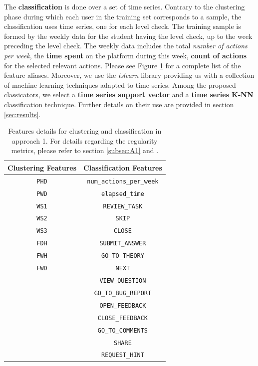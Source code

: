 \documentclass[sigplan,screen]{acmart}
\begin{document}
The \textbf{classification} is done over a set of time series. Contrary to the clustering phase during which each user in the training set corresponds to a sample, the classification uses time series, one for each level check. The training sample is formed by the weekly data for the student having the level check, up to the week preceding the level check. The weekly data includes the total \textit{number of actions per week}, the \textbf{time spent} on the platform during this week, \textbf{count of actions} for the selected relevant actions. Please see Figure \ref{tab:A1_feature_vectors} for a complete list of the feature aliases. Moreover, we use the \emph{tslearn} \cite{tslearn} library providing us with a collection of machine learning techniques adapted to time series. Among the proposed classicators, we select a \textbf{time series support vector} and a \textbf{time series K-NN} classification technique. Further details on their use are provided in section \ref{sec:results}.

\begin{table}[h]
    \centering
    \caption{Features details for clustering and classification in approach 1. For details regarding the regularity metrics, please refer to section \ref{subsec:A1} and \cite{quantifyreg}.}
    \begin{tabular}{|c|c|}
    \hline
        Clustering Features & Classification Features \\ \hline
        \texttt{PHD} & \texttt{num\_actions\_per\_week} \\ 
        \texttt{PWD} & \texttt{elapsed\_time} \\
        \texttt{WS1} & \texttt{REVIEW\_TASK} \\ 
        \texttt{WS2} &\texttt{SKIP} \\ 
        \texttt{WS3} &\texttt{CLOSE} \\ 
        \texttt{FDH} &\texttt{SUBMIT\_ANSWER} \\ 
        \texttt{FWH} &\texttt{GO\_TO\_THEORY} \\ 
        \texttt{FWD} &\texttt{NEXT} \\ 
        &\texttt{VIEW\_QUESTION} \\ 
        &\texttt{GO\_TO\_BUG\_REPORT} \\ 
        &\texttt{OPEN\_FEEDBACK} \\ 
        &\texttt{CLOSE\_FEEDBACK} \\ 
        &\texttt{GO\_TO\_COMMENTS} \\ 
        &\texttt{SHARE} \\ 
        &\texttt{REQUEST\_HINT} \\ \hline
    \end{tabular}
    \label{tab:A1_feature_vectors}
\end{table}
\end{document}
